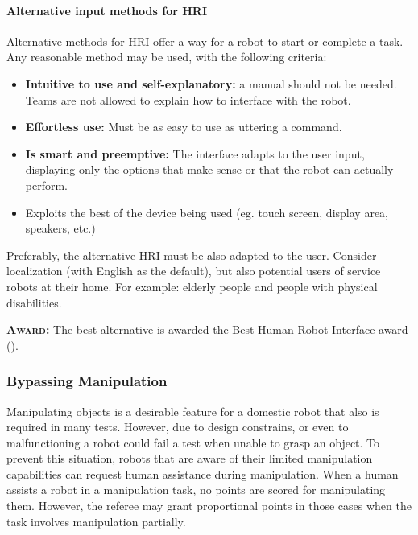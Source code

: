 \paragraph{Alternative input methods for HRI}
\label{rule:asralternative}
Alternative methods for HRI offer a way for a robot to start or complete a task. Any reasonable method may be used, with the following criteria:
\begin{itemize}
	\item \textbf{Intuitive to use and self-explanatory:} a manual should not be needed. Teams are not allowed to explain how to interface with the robot. %

	\item \textbf{Effortless use:} Must be as easy to use as uttering a command. %

	\item \textbf{Is smart and preemptive:} The interface adapts to the user input, displaying only the options that make sense or that the robot can actually perform.

	\item Exploits the best of the device being used (eg. touch screen, display area, speakers, etc.)
\end{itemize}

Preferably, the alternative HRI must be also adapted to the user. Consider localization (with English as the default), but also potential users of service robots at their home. For example: elderly people and people with physical disabilities.

\textbf{\textsc{Award:}} The best alternative is awarded the Best Human-Robot Interface award ().



\subsubsection{Bypassing Manipulation}
\label{rule:mancontinue}
Manipulating objects is a desirable feature for a domestic robot that also is required in many tests. However, due to design constrains, or even to malfunctioning a robot could fail a test when unable to grasp an object. To prevent this situation, robots that are aware of their limited manipulation capabilities can request human assistance during manipulation. When a human assists a robot in a manipulation task, no points are scored for manipulating them. However, the referee may grant proportional points in those cases when the task involves manipulation partially.

